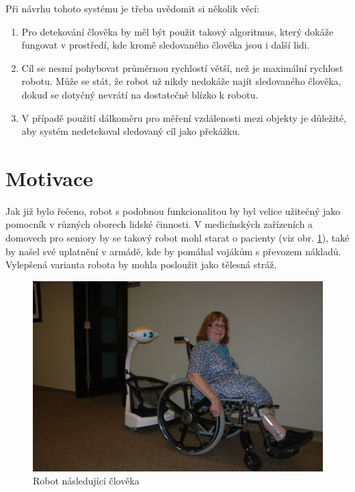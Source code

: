 \documentclass[twoside]{ctuthesis}
\theoremstyle{plain}
\theoremstyle{definition}
\theoremstyle{note}
\begin{document}
Při návrhu tohoto systému je třeba uvědomit si několik věcí:
\begin{enumerate}
	
	\item Pro detekování člověka by měl být použit takový algoritmus, který dokáže fungovat v prostředí, kde kromě sledovaného člověka jsou i další lidi.
	
	\item Cíl se nesmí pohybovat průměrnou rychlostí větší, než je maximální rychlost robotu. Může se stát, že robot už nikdy nedokáže najít sledovaného člověka, dokud se dotyčný nevrátí na dostatečně blízko k robotu.

	\item V případě použití dálkoměru pro měření vzdálenosti mezi objekty je důležité, aby systém nedetekoval sledovaný cíl jako překážku.
\end{enumerate}

\section{Motivace}

Jak již bylo řečeno, robot s podobnou funkcionalitou by byl velice užitečný jako pomocník v různých oborech lidské činnosti. V medicínských zařízeních a domovech pro seniory by se takový robot mohl starat o pacienty (viz obr. \ref{rnc}), také by našel své uplatnění v armádě, kde by pomáhal vojákům s převozem nákladů. Vylepšená varianta robota by mohla posloužit jako tělesná stráž.


\begin{figure}
	\caption{Robot následující člověka}

	\label{rnc}
	\includegraphics[width=\textwidth]{images/0/maxresdefault.jpg}
\end{figure}
\end{document}
